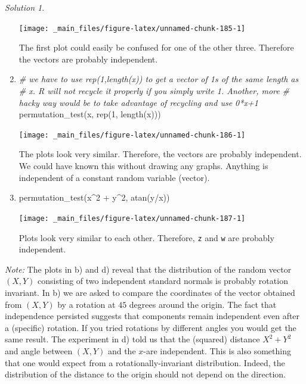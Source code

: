 \documentclass[
]{book}
\newenvironment{Shaded}{\begin{snugshade}}{\end{snugshade}}
\newcommand{\CommentTok}[1]{\textcolor[rgb]{0.56,0.35,0.01}{\textit{#1}}}
\newcommand{\DecValTok}[1]{\textcolor[rgb]{0.00,0.00,0.81}{#1}}
\newcommand{\FunctionTok}[1]{\textcolor[rgb]{0.00,0.00,0.00}{#1}}
\newcommand{\NormalTok}[1]{#1}
\newcommand{\SpecialCharTok}[1]{\textcolor[rgb]{0.00,0.00,0.00}{#1}}
\theoremstyle{definition}
\theoremstyle{definition}
\theoremstyle{definition}
\theoremstyle{definition}
\theoremstyle{remark}
\newtheorem*{solution}{Solution}
\begin{document}
\begin{solution}
\begin{enumerate}
  \begin{center}\texttt{[image: \_main\_files/figure-latex/unnamed-chunk-185-1]} \end{center}

  The first plot could easily be confused for one of the other three. Therefore the vectors are probably independent.
\item
\begin{Shaded}
\begin{Highlighting}[]
\CommentTok{\# we have to use rep(1,length(x)) to get a vector of 1s of the same length as}
\CommentTok{\# x.  R will not recycle it properly if you simply write 1.  Another, more}
\CommentTok{\# \textquotesingle{}hacky\textquotesingle{} way would be to take advantage of recycling and use 0*x+1}
\FunctionTok{permutation\_test}\NormalTok{(x, }\FunctionTok{rep}\NormalTok{(}\DecValTok{1}\NormalTok{, }\FunctionTok{length}\NormalTok{(x)))}
\end{Highlighting}
\end{Shaded}

  \begin{center}\texttt{[image: \_main\_files/figure-latex/unnamed-chunk-186-1]} \end{center}

  The plots look very similar. Therefore, the vectors are probably independent. We could have known this without drawing any graphs. Anything is independent of a constant random variable (vector).
\item
\begin{Shaded}
\begin{Highlighting}[]
\FunctionTok{permutation\_test}\NormalTok{(x}\SpecialCharTok{\^{}}\DecValTok{2} \SpecialCharTok{+}\NormalTok{ y}\SpecialCharTok{\^{}}\DecValTok{2}\NormalTok{, }\FunctionTok{atan}\NormalTok{(y}\SpecialCharTok{/}\NormalTok{x))}
\end{Highlighting}
\end{Shaded}

  \begin{center}\texttt{[image: \_main\_files/figure-latex/unnamed-chunk-187-1]} \end{center}

  Plots look very similar to each other. Therefore, \texttt{z} and \texttt{w} are probably independent.
\end{enumerate}

\emph{Note:} The plots in b) and d) reveal that the distribution of the random vector
\((X,Y)\) consisting of two independent standard normals is probably rotation
invariant. In b) we are asked to compare the coordinates of the vector obtained
from \((X,Y)\) by a rotation at \(45\) degrees around the origin. The fact that
independence persisted suggests that components remain independent even after a
(specific) rotation. If you tried rotations by different angles you would get
the same result. The experiment in d) told us that the (squared) distance
\(X^2+Y^2\) and angle between \((X,Y)\) and the \(x\)-are independent. This is also
something that one would expect from a rotationally-invariant distribution.
Indeed, the distribution of the distance to the origin should not depend on the
direction.


\end{solution}
\end{document}
